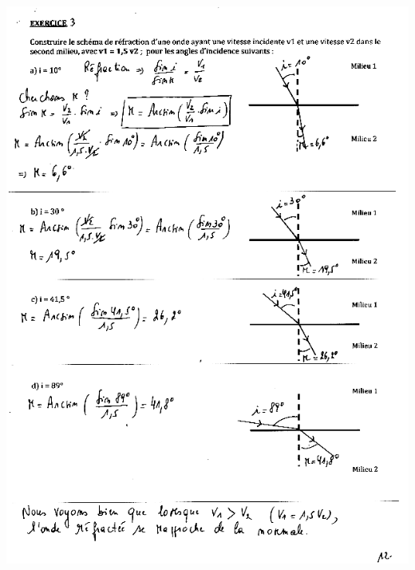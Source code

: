 \includegraphics[width=18.501cm,height=25.636cm]{Pictures/100000010000026D0000035C190239246DBF1AB2.png}

